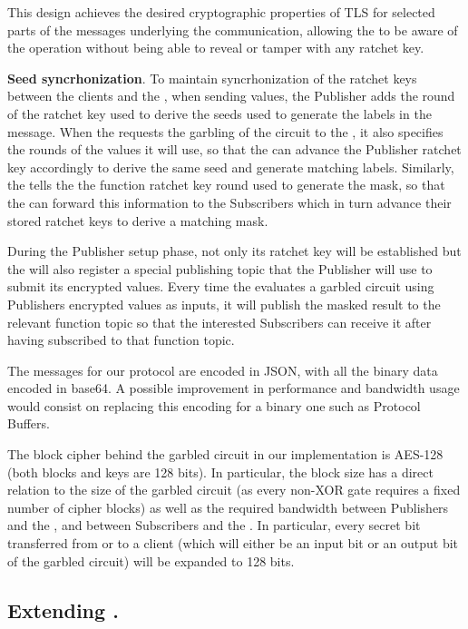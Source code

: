 This design achieves the desired cryptographic properties of TLS for selected
parts of the messages underlying the \MQTT{} communication, allowing the \broker
to be aware of the operation without being able to reveal or tamper with any
ratchet key.

\noindent\textbf{Seed syncrhonization}. To maintain syncrhonization of the
ratchet keys between the clients and the \garbler, when sending values, the
Publisher adds the round of the ratchet key used to derive the seeds used to
generate the labels in the message.  When the \broker requests the garbling of
the circuit to the \garbler, it also specifies the rounds of the values it will
use, so that the \garbler can advance the Publisher ratchet key accordingly to
derive the same seed and generate matching labels.  Similarly, the \garbler
tells the \broker the function ratchet key round used to generate the mask, so
that the \broker can forward this information to the Subscribers which in turn
advance their stored ratchet keys to derive a matching mask.

During the Publisher setup phase, not only its ratchet key will be established
but the \broker will also register a special publishing topic that the Publisher
will use to submit its encrypted values.  Every time the \broker evaluates a
garbled circuit using Publishers encrypted values as inputs, it will publish
the masked result to the relevant function topic so that the interested
Subscribers can receive it after having subscribed to that function topic.

The \MQTT{} messages for our protocol are encoded in JSON, with all the binary
data encoded in base64.  A possible improvement in performance and bandwidth
usage would consist on replacing this encoding for a binary one such as
Protocol Buffers.

The block cipher behind the garbled circuit in our implementation is AES-128
(both blocks and keys are 128 bits).  In particular, the block size has a
direct relation to the size of the garbled circuit (as every non-XOR gate
requires a fixed number of cipher blocks) as well as the required bandwidth
between Publishers and the \broker, and between Subscribers and the \broker.  In
particular, every secret bit transferred from or to a client (which will either
be an input bit or an output bit of the garbled circuit) will be expanded to
128 bits.

\subsection{Extending \libgarble.}


